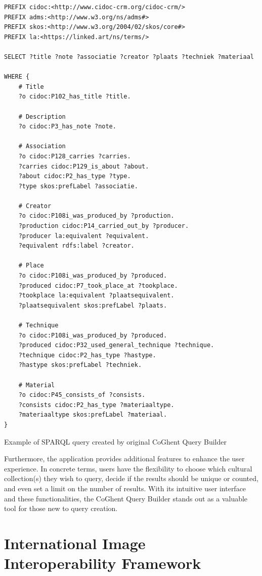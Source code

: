 \begin{listing}[htbp]
    \begin{verbatim}
PREFIX cidoc:<http://www.cidoc-crm.org/cidoc-crm/>
PREFIX adms:<http://www.w3.org/ns/adms#>
PREFIX skos:<http://www.w3.org/2004/02/skos/core#>
PREFIX la:<https://linked.art/ns/terms/>

SELECT ?title ?note ?associatie ?creator ?plaats ?techniek ?materiaal

WHERE {
    # Title
    ?o cidoc:P102_has_title ?title.
    
    # Description
    ?o cidoc:P3_has_note ?note.
    
    # Association
    ?o cidoc:P128_carries ?carries.
    ?carries cidoc:P129_is_about ?about.
    ?about cidoc:P2_has_type ?type.
    ?type skos:prefLabel ?associatie.
    
    # Creator
    ?o cidoc:P108i_was_produced_by ?production.
    ?production cidoc:P14_carried_out_by ?producer.
    ?producer la:equivalent ?equivalent.
    ?equivalent rdfs:label ?creator.
    
    # Place
    ?o cidoc:P108i_was_produced_by ?produced.
    ?produced cidoc:P7_took_place_at ?tookplace.
    ?tookplace la:equivalent ?plaatsequivalent.
    ?plaatsequivalent skos:prefLabel ?plaats.
    
    # Technique
    ?o cidoc:P108i_was_produced_by ?produced.
    ?produced cidoc:P32_used_general_technique ?technique.
    ?technique cidoc:P2_has_type ?hastype.
    ?hastype skos:prefLabel ?techniek.
    
    # Material
    ?o cidoc:P45_consists_of ?consists.
    ?consists cidoc:P2_has_type ?materiaaltype.
    ?materiaaltype skos:prefLabel ?materiaal.
}
    \end{verbatim}
    \caption{Example of SPARQL query created by original CoGhent Query Builder}
    \label{lst:coghent_builder_original}
\end{listing}

Furthermore, the application provides additional features to enhance the user experience. In concrete terms, users have the flexibility to choose which cultural collection(s) they wish to query, decide if the results should be unique or counted, and even set a limit on the number of results. With its intuitive user interface and these functionalities, the CoGhent Query Builder stands out as a valuable tool for those new to query creation.

\section{International Image Interoperability Framework}
\label{sec:iiif}

